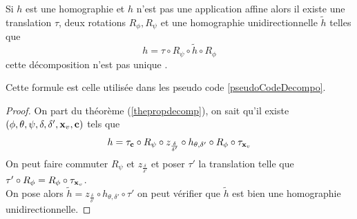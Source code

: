 \begin{corollaire}Si $h$ est une homographie et $h$ n'est pas une application affine alors il existe une translation $\tau$, deux rotations $R_\phi ,R_\psi$ et une homographie unidirectionnelle $\tilde{h}$ telles que
\begin{equation}
h=\tau \circ R_\psi \circ \tilde{h} \circ R_\phi
\end{equation}
cette décomposition n'est pas unique .
\end{corollaire}
		Cette formule est celle utilisée dans les pseudo code \ref{pseudoCodeDecompo}.
		\begin{proof}
	 On part du théorème (\ref{thepropdecomp}), on sait qu'il existe $(\phi,\theta,\psi,\delta,\delta',\mathbf{x}_v,\mathbf{c})$ tels que 
	 \begin{equation*}
	 h = \tau_{\mathbf{c}} \circ R_{\psi} \circ z_{\frac{\delta}{\delta'}} \circ h_{\theta,\delta'} \circ R_{\phi} \circ \tau_{\mathbf{x}_v}
	 \end{equation*}
	 On peut faire commuter $R_\psi$ et $z_{\frac{\delta}{\delta'}}$ et poser $\tau'$ la translation telle que $\tau' \circ R_\phi =  R_\phi \circ \tau_{\mathbf{x}_v}$.\\
	 On pose alors $\tilde{h} = z_{\frac{\delta}{\delta'}} \circ 
	 h_{\theta,\delta'} \circ \tau'$ on peut vérifier que $\tilde{h}$ est bien une homographie unidirectionnelle.
	 \end{proof}
